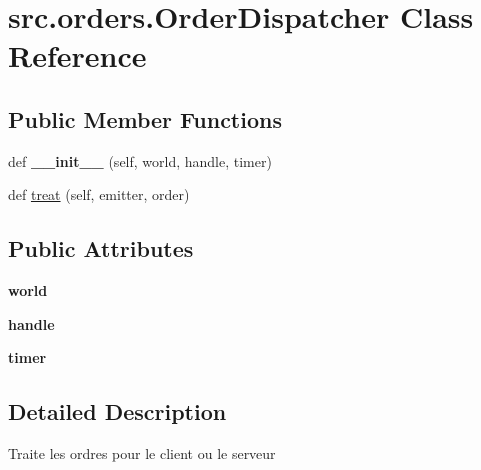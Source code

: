 \hypertarget{classsrc_1_1orders_1_1_order_dispatcher}{}\section{src.\+orders.\+Order\+Dispatcher Class Reference}
\label{classsrc_1_1orders_1_1_order_dispatcher}
\subsection*{Public Member Functions}
\begin{DoxyCompactItemize}
\item 
\hypertarget{classsrc_1_1orders_1_1_order_dispatcher_a52401206efd0e21a0ab4c1c365e6a877}{}\label{classsrc_1_1orders_1_1_order_dispatcher_a52401206efd0e21a0ab4c1c365e6a877} 
def {\bfseries \+\_\+\+\_\+init\+\_\+\+\_\+} (self, world, handle, timer)
\item 
def \hyperlink{classsrc_1_1orders_1_1_order_dispatcher_a4cd2412ef1f923180f2f1c00de132869}{treat} (self, emitter, order)
\end{DoxyCompactItemize}
\subsection*{Public Attributes}
\begin{DoxyCompactItemize}
\item 
\hypertarget{classsrc_1_1orders_1_1_order_dispatcher_aeab4a280d6a362a17ced17fb30425514}{}\label{classsrc_1_1orders_1_1_order_dispatcher_aeab4a280d6a362a17ced17fb30425514} 
{\bfseries world}
\item 
\hypertarget{classsrc_1_1orders_1_1_order_dispatcher_afafd33c6e604360897b3d8377e795990}{}\label{classsrc_1_1orders_1_1_order_dispatcher_afafd33c6e604360897b3d8377e795990} 
{\bfseries handle}
\item 
\hypertarget{classsrc_1_1orders_1_1_order_dispatcher_ad62c54596f3329bbf65381b5d54e560a}{}\label{classsrc_1_1orders_1_1_order_dispatcher_ad62c54596f3329bbf65381b5d54e560a} 
{\bfseries timer}
\end{DoxyCompactItemize}


\subsection{Detailed Description}
\begin{DoxyVerb}Traite les ordres pour le client ou le serveur \end{DoxyVerb}
 

